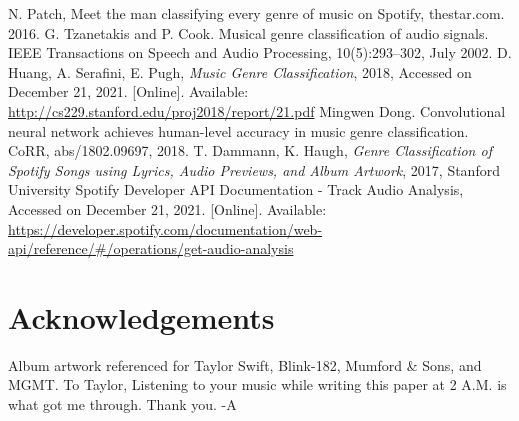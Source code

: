 \documentclass[conference]{IEEEtran}
\begin{document}
\pagebreak
\begin{thebibliography}{00}
 N. Patch, Meet the man classifying every genre of music on Spotify, thestar.com. 2016.
 G. Tzanetakis and P. Cook. Musical genre classification of audio signals. IEEE Transactions on Speech and Audio Processing, 10(5):293–302, July 2002.
 D. Huang, A. Serafini, E. Pugh, \emph{Music Genre Classification}, 2018, Accessed on December 21, 2021. [Online]. Available: \url{http://cs229.stanford.edu/proj2018/report/21.pdf}
 Mingwen Dong. Convolutional neural network achieves human-level accuracy in music genre classification. CoRR, abs/1802.09697, 2018.
 T. Dammann, K. Haugh, \emph{Genre Classification of Spotify Songs using Lyrics, Audio Previews, and Album Artwork}, 2017, Stanford University
 Spotify Developer API Documentation - Track Audio Analysis, Accessed on December 21, 2021. [Online]. Available: \url{ https://developer.spotify.com/documentation/web-api/reference/#/operations/get-audio-analysis}

\end{thebibliography}

\section*{Acknowledgements}
Album artwork referenced for Taylor Swift, Blink-182, Mumford \& Sons, and MGMT.
\newline
\newline
To Taylor,
\newline
\newline
Listening to your music while writing this paper at 2 A.M. 
is what got me through. 
\newline
\newline
Thank you.
\newline
\newline
-A
\end{document}
